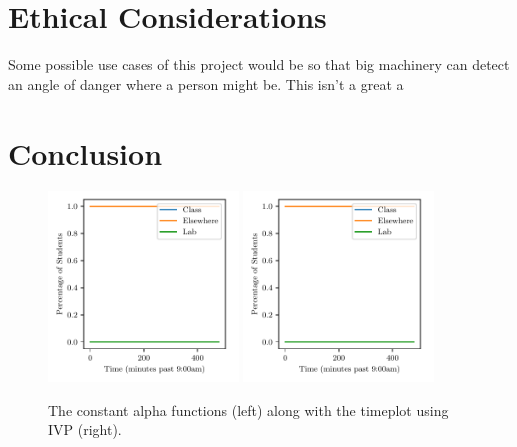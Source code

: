 \documentclass[11pt]{amsart}
\begin{document}
\section{Ethical Considerations}
Some possible use cases of this project would be so that big machinery can detect an angle of danger where a person might be. 
This isn't a great a 

\section{Conclusion}













\begin{figure}[htp]
    \centering
    \includegraphics[width=0.45\textwidth]{temp.pdf}\hfill
    \includegraphics[width=0.45\textwidth]{temp.pdf}\hfill
    \caption{The constant alpha functions (left) along with the timeplot using IVP (right).}
    \label{fig:constant_alpha}

\end{figure}
\end{document}
